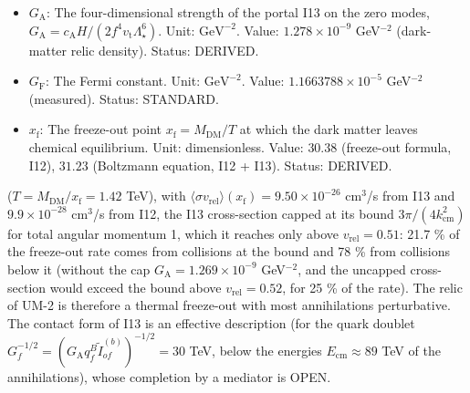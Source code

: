 \documentclass[
  10pt,
]{article}
\providecommand{\tightlist}{%
  \setlength{\itemsep}{0pt}\setlength{\parskip}{0pt}}
\begin{document}
\begin{itemize}
\tightlist
\item
  \(G_{\mathrm{A}}\): The four-dimensional strength of the portal I13 on
  the zero modes,
  \(G_{\mathrm{A}} = c_{\mathrm{A}}H/(2f^4v_{\mathrm{t}}\Lambda_\star^6)\).
  Unit: \(\mathrm{GeV}^{-2}\). Value: \(1.278\times10^{-9}\)
  GeV\(^{-2}\) (dark-matter relic density). Status: DERIVED.
\item
  \(G_{\mathrm{F}}\): The Fermi constant. Unit: \(\mathrm{GeV}^{-2}\).
  Value: \(1.1663788\times10^{-5}\) GeV\(^{-2}\) (measured). Status:
  STANDARD.
\item
  \(x_{\mathrm{f}}\): The freeze-out point
  \(x_{\mathrm{f}} = M_{\mathrm{DM}}/T\) at which the dark matter leaves
  chemical equilibrium. Unit: dimensionless. Value: \(30.38\)
  (freeze-out formula, I12), \(31.23\) (Boltzmann equation, I12 + I13).
  Status: DERIVED.
\end{itemize}

(\(T = M_{\mathrm{DM}}/x_{\mathrm{f}} = 1.42\) TeV), with
\(\langle\sigma v_{\mathrm{rel}}\rangle(x_{\mathrm{f}}) = 9.50\times10^{-26}\)
cm\(^3\)/s from I13 and \(9.9\times10^{-28}\) cm\(^3\)/s from I12, the
I13 cross-section capped at its bound \(3\pi/(4k_{\mathrm{cm}}^2)\) for
total angular momentum 1, which it reaches only above
\(v_{\mathrm{rel}} = 0.51\): 21.7 \% of the freeze-out rate comes from
collisions at the bound and 78 \% from collisions below it (without the
cap \(G_{\mathrm{A}} = 1.269\times10^{-9}\) GeV\(^{-2}\), and the
uncapped cross-section would exceed the bound above
\(v_{\mathrm{rel}} = 0.52\), for 25 \% of the rate). The relic of UM-2
is therefore a thermal freeze-out with most annihilations perturbative.
The contact form of I13 is an effective description (for the quark
doublet
\(G_f^{-1/2} = (G_{\mathrm{A}}q^B_f\tilde I^{(b)}_{of})^{-1/2} = 30\)
TeV, below the energies \(E_{\mathrm{cm}} \approx 89\) TeV of the
annihilations), whose completion by a mediator is OPEN.
\end{document}
